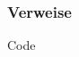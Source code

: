 \begin{frame}
    \frametitle{Verweise}
    \begin{block}{Code}
        
    \end{block}
\end{frame}
